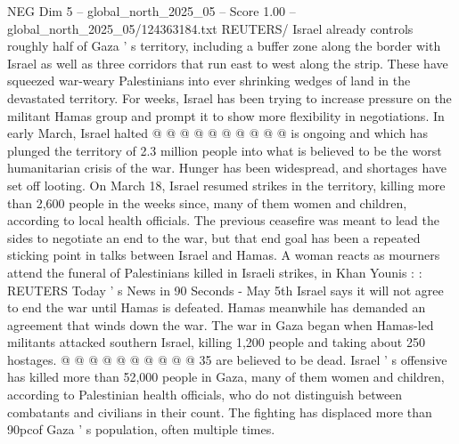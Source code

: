 \begin{textsample}{NEG Dim 5 – global\_north\_2025\_05 – Score 1.00 – global\_north\_2025\_05/124363184.txt}
REUTERS/ Israel already controls roughly half of Gaza ' s territory, including a buffer zone along the border with Israel as well as three corridors that run east to west along the strip.
These have squeezed war-weary Palestinians into ever shrinking wedges of land in the devastated territory.
For weeks, Israel has been trying to increase pressure on the militant Hamas group and prompt it to show more flexibility in negotiations.
In early March, Israel halted @ @ @ @ @ @ @ @ @ @ is ongoing and which has plunged the territory of 2.3 million people into what is believed to be the worst humanitarian crisis of the war.
Hunger has been widespread, and shortages have set off looting.
On March 18, Israel resumed strikes in the territory, killing more than 2,600 people in the weeks since, many of them women and children, according to local health officials.
The previous ceasefire was meant to lead the sides to negotiate an end to the war, but that end goal has been a repeated sticking point in talks between Israel and Hamas.
A woman reacts as mourners attend the funeral of Palestinians killed in Israeli strikes, in Khan Younis : : REUTERS Today ' s News in 90 Seconds - May 5th Israel says it will not agree to end the war until Hamas is defeated.
Hamas meanwhile has demanded an agreement that winds down the war.
The war in Gaza began when Hamas-led militants attacked southern Israel, killing 1,200 people and taking about 250 hostages. @ @ @ @ @ @ @ @ @ @ 35 are believed to be dead.
Israel ' s offensive has killed more than 52,000 people in Gaza, many of them women and children, according to Palestinian health officials, who do not distinguish between combatants and civilians in their count.
The fighting has displaced more than 90pcof Gaza ' s population, often multiple times.

\end{textsample}
